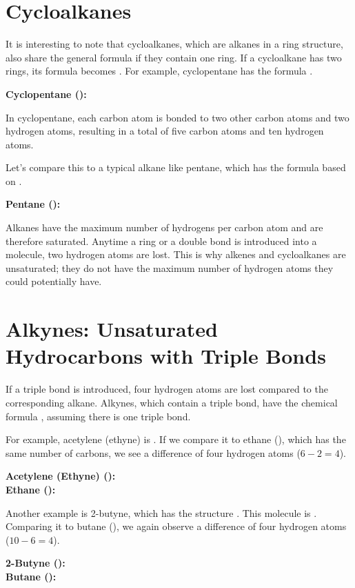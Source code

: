 \documentclass{article}
\begin{document}
\section{Cycloalkanes}
It is interesting to note that cycloalkanes, which are alkanes in a ring structure, also share the general formula  if they contain one ring. If a cycloalkane has two rings, its formula becomes . For example, cyclopentane has the formula .
\begin{center}
    \textbf{Cyclopentane ():} 
\end{center}
In cyclopentane, each carbon atom is bonded to two other carbon atoms and two hydrogen atoms, resulting in a total of five carbon atoms and ten hydrogen atoms.

Let's compare this to a typical alkane like pentane, which has the formula  based on .
\begin{center}
    \textbf{Pentane ():} 
\end{center}
Alkanes have the maximum number of hydrogens per carbon atom and are therefore saturated. Anytime a ring or a double bond is introduced into a molecule, two hydrogen atoms are lost. This is why alkenes and cycloalkanes are unsaturated; they do not have the maximum number of hydrogen atoms they could potentially have.

\section{Alkynes: Unsaturated Hydrocarbons with Triple Bonds}
If a triple bond is introduced, four hydrogen atoms are lost compared to the corresponding alkane. Alkynes, which contain a triple bond, have the chemical formula , assuming there is one triple bond.

For example, acetylene (ethyne) is . If we compare it to ethane (), which has the same number of carbons, we see a difference of four hydrogen atoms ($6 - 2 = 4$).
\begin{center}
    \textbf{Acetylene (Ethyne) ():}  \\[1em]
    \textbf{Ethane ():} 
\end{center}
Another example is 2-butyne, which has the structure .
This molecule is . Comparing it to butane (), we again observe a difference of four hydrogen atoms ($10 - 6 = 4$).
\begin{center}
    \textbf{2-Butyne ():}  \\[1em]
    \textbf{Butane ():} 
\end{center}
\end{document}

